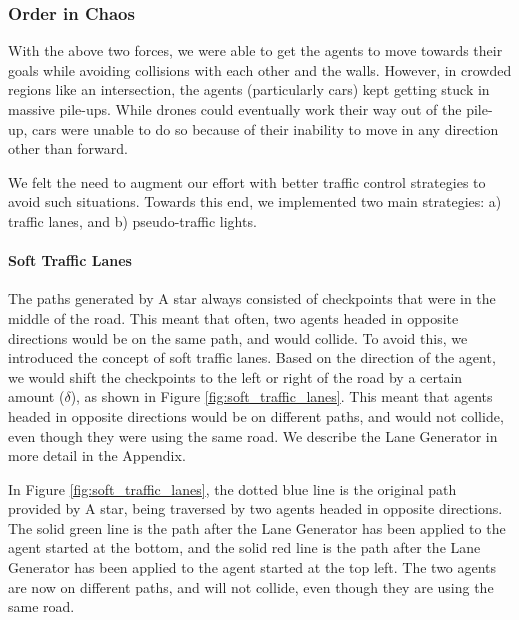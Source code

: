 \documentclass[a4paper,12pt]{article}
\begin{document}
\subsubsection{Order in Chaos}
\label{method_order_in_chaos}

With the above two forces, we were able to get the agents to move towards their goals while avoiding collisions with each other and the walls. However, in crowded regions like an intersection, the agents (particularly cars) kept getting stuck in massive pile-ups. While drones could eventually work their way out of the pile-up, cars were unable to do so because of their inability to move in any direction other than forward. 

We felt the need to augment our effort with better traffic control strategies to avoid such situations. Towards this end, we implemented two main strategies: a) traffic lanes, and b) pseudo-traffic lights.

\paragraph{Soft Traffic Lanes}
The paths generated by A star always consisted of checkpoints that were in the middle of the road. This meant that often, two agents headed in opposite directions would be on the same path, and would collide. To avoid this, we introduced the concept of soft traffic lanes. Based on the direction of the agent, we would shift the checkpoints to the left or right of the road by a certain amount ($\delta$), as shown in Figure \ref{fig:soft_traffic_lanes}. This meant that agents headed in opposite directions would be on different paths, and would not collide, even though they were using the same road. We describe the Lane Generator in more detail in the Appendix.




In Figure \ref{fig:soft_traffic_lanes}, the dotted blue line is the original path provided by A star, being traversed by two agents headed in opposite directions. The solid green line is the path after the Lane Generator has been applied to the agent started at the bottom, and the solid red line is the path after the Lane Generator has been applied to the agent started at the top left. The two agents are now on different paths, and will not collide, even though they are using the same road.
\end{document}
